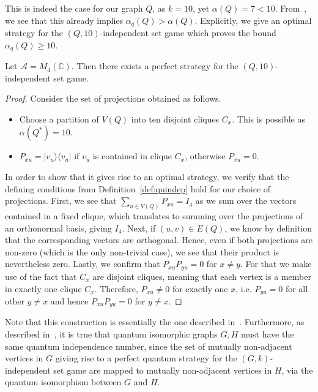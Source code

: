 This is indeed the case for our graph $Q$, as $k = 10$, yet $\alpha(Q) = 7 < 10$.
From~\cite{godsil2024quantumindependencechromaticnumbers}, we see that this already implies $\alpha_q(Q) > \alpha(Q)$.
Explicitly, we give an optimal strategy for the $(Q, 10)$-independent set game which proves the bound $\alpha_q(Q) \geq 10$.

\begin{lemma}
    Let $\mathcal{A} = M_4(\mathbb{C})$. Then there exists a perfect strategy for the $(Q, 10)$-independent set 
    game. 
\end{lemma}
\begin{proof}
    Consider the set of projections obtained as follows.
    \begin{itemize}
        \item Choose a partition of $V(Q)$ into ten disjoint cliques $C_x$. This is possible as $\alpha(Q^*) = 10$.
        \item $P_{xu} = |v_u \rangle\langle v_u|$ if $v_u$ is contained in clique $C_x$, otherwise $P_{xu} = 0$. 
    \end{itemize}
    In order to show that it gives rise to an optimal strategy, we verify that the defining
    conditions from Definition~\ref{def:quindep} hold for our choice of projections.
    First, we see that $\sum_{u \in V(Q)} P_{xu} = I_4$ as we sum over the vectors contained in a 
    fixed clique, which translates to summing over the projections
    of an orthonormal basis, giving $I_4$.
    Next, if $(u, v) \in E(Q)$, we know by definition that the corresponding vectors are
    orthogonal.
    Hence, even if both projections are non-zero (which is the only non-trivial case),
    we see that their product is nevertheless zero.
    Lastly, we confirm that $P_{xu} P_{yu} = 0$ for $x \neq y$.
    For that we make use of the fact that $C_x$ are disjoint cliques, meaning that 
    each vertex is a member in exactly one clique $C_x$.
    Therefore, $P_{xu} \neq 0$ for exactly one $x$, i.e. $P_{yu} = 0$ for all other $y \neq x$
    and hence $P_{xu} P_{yu} = 0$ for $y \neq x$.
\end{proof}
Note that this construction is essentially the one described in~\cite{godsil2024quantumindependencechromaticnumbers}.
%
Furthermore, as described in~\cite[Lemma 5.14]{atserias2017quantumnonsignallinggraphisomorphisms},
it is true that quantum isomorphic graphs
$G, H$ must have the same quantum independence number,
since the set of mutually non-adjacent vertices in $G$ giving rise
to a perfect quantum strategy for the $(G, k)$-independent set game 
are mapped to mutually non-adjacent vertices in $H$, via the quantum isomorphism
between $G$ and $H$.


